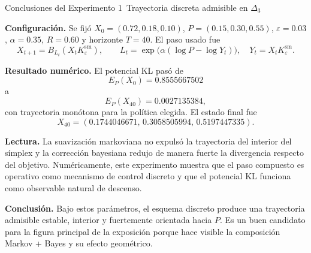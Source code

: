 \documentclass[10pt]{article}
\begin{document}
\small
\begin{center}
{\Large Conclusiones del Experimento 1}\
Trayectoria discreta admisible en $\Delta_3$
\end{center}

\textbf{Configuraci\'on.} Se fij\'o $X_0=(0.72,0.18,0.10)$, $P=(0.15,0.30,0.55)$, $\varepsilon=0.03$, $\alpha=0.35$, $R=0.60$ y horizonte $T=40$. El paso usado fue
\[
X_{t+1}=B_{L_t}(X_t K_{\varepsilon}^{\mathrm{sm}}),
\qquad
L_t=\exp\!\bigl(\alpha(\log P-\log Y_t)\bigr),
\quad Y_t=X_tK_{\varepsilon}^{\mathrm{sm}}.
\]

\textbf{Resultado num\'erico.} El potencial KL pas\'o de
\[
E_P(X_0)=0.8555667502
\]
a
\[
E_P(X_{40})=0.0027135384,
\]
con trayectoria mon\'otona para la pol\'itica elegida. El estado final fue
\[
X_{40}=(0.1744046671,\,0.3058505994,\,0.5197447335).
\]

\textbf{Lectura.} La suavizaci\'on markoviana no expuls\'o la trayectoria del interior del s\'implex y la correcci\'on bayesiana redujo de manera fuerte la divergencia respecto del objetivo. Num\'ericamente, este experimento muestra que el paso compuesto es operativo como mecanismo de control discreto y que el potencial KL funciona como observable natural de descenso.

\textbf{Conclusi\'on.} Bajo estos par\'ametros, el esquema discreto produce una trayectoria admisible estable, interior y fuertemente orientada hacia $P$. Es un buen candidato para la figura principal de la exposici\'on porque hace visible la composici\'on Markov + Bayes y su efecto geom\'etrico.
\end{document}
